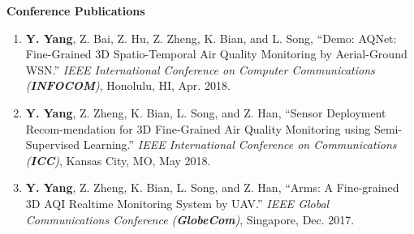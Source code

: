 \documentclass[11pt]{article}
\makeatletter
\newlength{\bibhang}
\newlength{\bibsep}{\@listi \global\bibsep\itemsep \global\advance\bibsep by\parsep}
\newenvironment{bibsection}
    {\begin{enumerate}{}{
        \setlength{\leftmargin}{\bibhang}
        \setlength{\itemindent}{-\leftmargin}
        \setlength{\itemsep}{\bibsep}
        \setlength{\parsep}{\z@}
        \setlength{\partopsep}{0pt}
        \setlength{\topsep}{0pt}}}
    {\end{enumerate}\vspace{-.6\baselineskip}}
\renewcommand{\section}[1]{\pagebreak[3]%
    \hyphenpenalty=10000%
    \vspace{1.5\baselineskip}%
    \phantomsection\addcontentsline{toc}{section}{#1}%
    \noindent\llap{\scshape\smash{\parbox[t]{\marginparwidth}{\raggedright #1}}}%
    \vspace{-\baselineskip}\par}
\newcommand{\halfblankline}{\quad\vspace{-0.5\baselineskip}\pagebreak[3]}
\makeatother
\begin{document}
\halfblankline

\textbf{Conference Publications}
\vspace{-.03in}
\begin{enumerate}
    \item {\bf Y. Yang}, Z. Bai, Z. Hu, Z. Zheng, K. Bian, and L. Song, ``Demo: AQNet: Fine-Grained 3D Spatio-Temporal Air Quality Monitoring by Aerial-Ground WSN.'' {\em IEEE International Conference on Computer Communications (\textbf{INFOCOM})}, Honolulu, HI, Apr. 2018.
    \item {\bf Y. Yang}, Z. Zheng, K. Bian, L. Song, and Z. Han, ``Sensor Deployment Recom-mendation for 3D Fine-Grained Air Quality Monitoring using Semi-Supervised Learning.'' {\em IEEE International Conference on Communications (\textbf{ICC})}, Kansas City, MO, May 2018.
    \item {\bf Y. Yang}, Z. Zheng, K. Bian, L. Song, and Z. Han, ``Arms: A Fine-grained 3D AQI Realtime Monitoring System by UAV.'' {\em IEEE Global Communications Conference (\textbf{GlobeCom})}, Singapore, Dec. 2017.
\end{enumerate}

\iffalse
\begin{bibsection}
    \item {\bf Yuzhe Yang}, Zixuan Bai, Zhiwen Hu, Zijie Zheng, Kaigui Bian, and Lingyang Song, ``Demo: AQNet: Fine-Grained 3D Spatio-Temporal Air Quality Monitoring by Aerial-Ground WSN.'' {\em IEEE International Conference on Computer Communications~(\textbf{INFOCOM'18})}, Honolulu, HI, Apr. 2018.
    \item {\bf Yuzhe Yang}, Zijie Zheng, Kaigui Bian, Lingyang Song, and Zhu Han, ``Sensor Deployment Recommendation for 3D Fine-Grained Air Quality Monitoring using Semi-Supervised Learning.'' {\em IEEE International Conference on Communications~(\textbf{ICC'18})}, Kansas City, MO, May 2018.
    \item {\bf Yuzhe Yang}, Zijie Zheng, Kaigui Bian, Yun Jiang, Lingyang Song, and Zhu Han, ``Arms: A Fine-grained 3D AQI Realtime Monitoring System by UAV.'' {\em IEEE Global Communications Conference~(\textbf{GlobeCom'17})}, Singapore, Dec. 2017.
\end{bibsection}
\fi


\iffalse
\section{Preprints}
\vspace{-.125in}
\begin{bibsection}
    \item Toomey, T.L., Erickson, D.J., Carlin, B.P., Lenk, K.M., {\bf Quick, H.S.}, and Harwood, E.M. ``Do neighborhood attributes moderate the relationship between alcohol establishment density and crime?" 2012. Submitted to \emph{Prevention Science}.
\end{bibsection}
\fi
\end{document}
